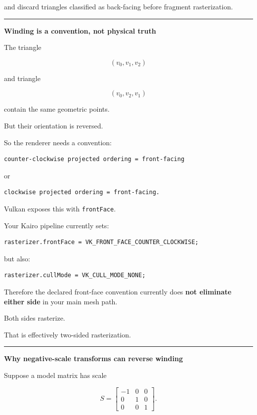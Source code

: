 and discard triangles classified as back-facing before fragment rasterization.

\begin{center}\rule{0.5\linewidth}{0.5pt}\end{center}

\textbf{Winding is a convention, not physical truth}

The triangle

\[
(v_0,v_1,v_2)
\]

and triangle

\[
(v_0,v_2,v_1)
\]

contain the same geometric points.

But their orientation is reversed.

So the renderer needs a convention:

\begin{verbatim}
counter-clockwise projected ordering = front-facing
\end{verbatim}

or

\begin{verbatim}
clockwise projected ordering = front-facing.
\end{verbatim}

Vulkan exposes this with \texttt{frontFace}.

Your Kairo pipeline currently sets:

\begin{verbatim}
rasterizer.frontFace = VK_FRONT_FACE_COUNTER_CLOCKWISE;
\end{verbatim}

but also:

\begin{verbatim}
rasterizer.cullMode = VK_CULL_MODE_NONE;
\end{verbatim}

Therefore the declared front-face convention currently does \textbf{not eliminate either side} in your main mesh path.

Both sides rasterize.

That is effectively two-sided rasterization.

\begin{center}\rule{0.5\linewidth}{0.5pt}\end{center}

\textbf{Why negative-scale transforms can reverse winding}

Suppose a model matrix has scale

\[
S=
\begin{bmatrix}
-1&0&0\\
0&1&0\\
0&0&1
\end{bmatrix}.
\]

